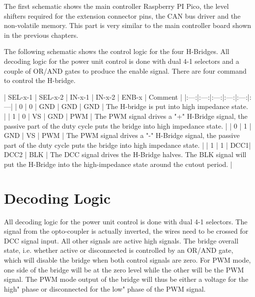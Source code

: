 The first schematic shows the main controller Raspberry PI Pico, the level shifters required for the extension connector pins, the CAN bus driver and the non-volatile memory. This part is very similar to the main controller board shown in the previous chapters.


The following schematic shows the control logic for the four H-Bridges. All decoding logic for the power unit control is done with dual 4-1 selectors and a couple of OR/AND gates to produce the enable signal. There are four command to control the H-bridge.

| SEL-x-1 | SEL-x-2 | IN-x-1 | IN-x-2 | ENB-x | Comment |
|:---:|:---:|:---:|:---:|:---:|:---|
| 0 | 0 | GND | GND | GND | The H-bridge is put into high impedance state. |
| 1 | 0 | VS | GND | PWM | The PWM signal drives a "+" H-Bridge signal, the passive part of the duty cycle puts the bridge into high impedance state. |
| 0 | 1 | GND | VS | PWM | The PWM signal drives a "-" H-Bridge signal, the passive part of the duty cycle puts the bridge into high impedance state. |
| 1 | 1 | DCC1| DCC2 | BLK | The DCC signal drives the H-Bridge halves. The BLK signal will put the H-Bridge into the high-impedance state around the cutout period. |

\section{Decoding Logic}

All decoding logic for the power unit control is done with dual 4-1 selectors. The signal from the opto-coupler is actually inverted, the wires need to be crossed for DCC signal input. All other signals are active high signals. The bridge overall state, i.e. whether active or disconnected is controlled by an OR/AND gate, which will disable the bridge when both control signals are zero. For PWM mode, one side of the bridge will be at the zero level while the other will be the PWM signal. The PWM mode output of the bridge will thus be either a voltage for the high" phase or disconnected for the low" phase of the PWM signal.


